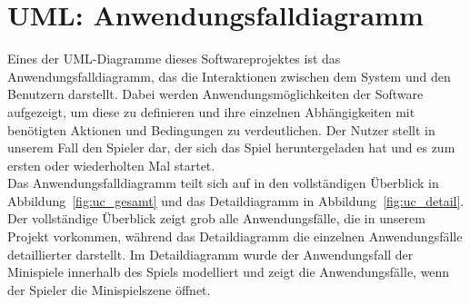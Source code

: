 \chapter{UML: Anwendungsfalldiagramm}\label{ch:uml_uc}
Eines der UML-Diagramme dieses Softwareprojektes ist das Anwendungsfalldiagramm, 
das die Interaktionen zwischen dem System und den Benutzern darstellt. 
Dabei werden Anwendungsmöglichkeiten der Software aufgezeigt, um diese zu definieren und ihre einzelnen Abhängigkeiten 
mit benötigten Aktionen und Bedingungen zu verdeutlichen.
Der Nutzer stellt in unserem Fall den Spieler dar, der sich das Spiel heruntergeladen hat und es zum ersten oder 
wiederholten Mal startet.\\
\newline
Das Anwendungsfalldiagramm teilt sich auf in den vollständigen Überblick in Abbildung~\ref{fig:uc_gesamt} und das 
Detaildiagramm in Abbildung~\ref{fig:uc_detail}.
Der vollständige Überblick zeigt grob alle Anwendungsfälle, die in unserem Projekt vorkommen,
während das Detaildiagramm die einzelnen Anwendungsfälle detaillierter darstellt. 
Im Detaildiagramm wurde der Anwendungsfall der Minispiele innerhalb des Spiels modelliert und zeigt die Anwendungsfälle,
wenn der Spieler die Minispielszene öffnet. \\

